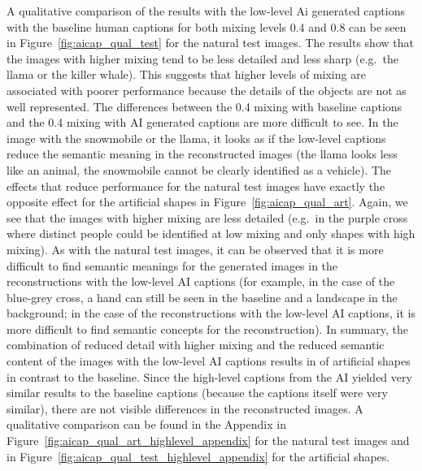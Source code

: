 A qualitative comparison of the results with the low-level Ai generated captions with the baseline human captions for both mixing levels 0.4 and 0.8 can be seen in Figure~\ref{fig:aicap_qual_test} for the natural test images. The results show that the images with higher mixing tend to be less detailed and less sharp (e.g.\ the llama or the killer whale). This suggests that higher levels of mixing are associated with poorer performance because the details of the objects are not as well represented. The differences between the 0.4 mixing with baseline captions and the 0.4 mixing with AI generated captions are more difficult to see. In the image with the snowmobile or the llama, it looks as if the low-level captions reduce the semantic meaning in the reconstructed images (the llama looks less like an animal, the snowmobile cannot be clearly identified as a vehicle). The effects that reduce performance for the natural test images have exactly the opposite effect for the artificial shapes in Figure~\ref{fig:aicap_qual_art}. Again, we see that the images with higher mixing are less detailed (e.g.\ in the purple cross where distinct people could be identified at low mixing and only shapes with high mixing). As with the natural test images, it can be observed that it is more difficult to find semantic meanings for the generated images in the reconstructions with the low-level AI captions (for example, in the case of the blue-grey cross, a hand can still be seen in the baseline and a landscape in the background; in the case of the reconstructions with the low-level AI captions, it is more difficult to find semantic concepts for the reconstruction). In summary, the combination of reduced detail with higher mixing and the reduced semantic content of the images with the low-level AI captions results in  of artificial shapes in contrast to the baseline.  Since the high-level captions from the AI yielded very similar results to the baseline captions (because the captions itself were very similar), there are not visible differences in the reconstructed images. A qualitative comparison can be found in the Appendix in Figure~\ref{fig:aicap_qual_art_highlevel_appendix} for the natural test images and in Figure~\ref{fig:aicap_qual_test_highlevel_appendix} for the artificial shapes.


